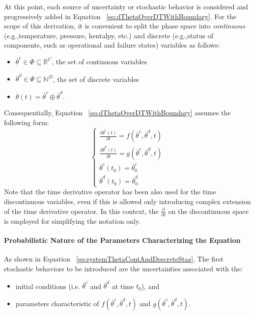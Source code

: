 At this point, each source of uncertainty or stochastic behavior is considered and progressively added in 
Equation ~\ref{eq:dThetaOverDTWithBoundary}.
For the scope of this derivation, it is convenient to split the phase space into \textit{continuous} (e.g.,temperature,
pressure, hentalpy, etc.) and discrete (e.g.,status of components, such as operational and failure states) variables
as follows: 
\begin{itemize}
 \item $ \overline{\theta}^{c} \in \Phi \subseteq \mathbb{R}^{C}$, the set of continuous variables
 \item $ \overline{\theta}^{d} \in \Psi \subseteq \mathbb{N}^{D}$, the set of discrete variables
 \item $\overline{\theta}(t) = \overline{\theta}^{c} \oplus \overline{\theta}^{d}$.
\end{itemize}
Consequentially, Equation ~\ref{eq:dThetaOverDTWithBoundary} assumes the following form:
\begin{equation}
\label{eq:systemThetaContAndDescrete}
\left\{\begin{matrix}
\frac{\partial  \overline{\theta}^{c}\left ( t \right )}{\partial t}=f\left ( \overline{\theta}^{c},\overline{\theta}^{d},t \right ) \\ 
\frac{\partial  \overline{\theta}^{d}\left ( t \right )}{\partial t}=g\left ( \overline{\theta}^{c},\overline{\theta}^{d},t \right )\\
 \overline{\theta}^{c}\left ( t_{0} \right ) = \overline{\theta}^{c}_{0}\\
 \overline{\theta}^{d}\left ( t_{0} \right ) = \overline{\theta}^{d}_{0}
\end{matrix}\right.
\end{equation}
Note that the time derivative operator has been also used for the time discontinuous variables, even
if this is allowed only introducing complex extension of the time derivative operator. In this context, the $\frac{\partial  }{\partial t}$ on the discontinuous space is employed for simplifying the notation only.

\paragraph{Probabilistic Nature of the Parameters Characterizing the Equation}
As shown in Equation ~\ref{eq:systemThetaContAndDescreteStaz}, The first stochastic behaviors to be introduced are the 
uncertainties associated with the:
\begin{itemize}
  \item initial conditions (i.e. $\overline{\theta}^{c}$ and $\overline{\theta}^{d}$ at time $t_{0}$), and
  \item parameters characteristic of  $f\left ( \overline{\theta}^{c},\overline{\theta}^{d},t \right )$ and $g\left ( \overline{\theta}^{c},\overline{\theta}^{d},t \right )$.
\end{itemize}

